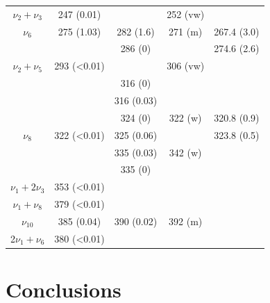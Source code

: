 \begin{table}[H]
\begin{center}
\begin{tabular}{c c c c c}
 		  $\nu_{2}+\nu_{3}$& 247 (0.01) &  & 252 (vw) & \\
 		  $\nu_{6}$ & 275 (1.03) & 282 (1.6) & 271 (m) & 267.4 (3.0)\\
 		  	&  & 286 (0) &  & 274.6 (2.6)\\
 		  	$\nu_{2}+ \nu_{5}$ & 293 (<0.01) &  & 306 (vw) & \\
 		  	& & 316 (0) & & \\
 		   & & 316 (0.03) & & \\
 		    &  & 324 (0) & 322 (w) & 320.8 (0.9)\\
 		    $\nu_{8}$& 322 (<0.01) & 325 (0.06) & & 323.8 (0.5)\\
 		    &  & 335 (0.03) & 342 (w) & \\
 		    & & 335 (0) & & \\
 		    $\nu_{1}+ 2\nu_{3}$ & 353 (<0.01) & &  & \\	
 		    $\nu_{1}+ \nu_{8}$ & 379 (<0.01) & & & \\
 		    $\nu_{10}$ & 385 (0.04) & 390 (0.02) &  392 (m) & \\
 		    2$\nu_{1}+ \nu_{6}$ & 380 (<0.01) &  & & \\
 		    \bottomrule	    
 		  \end{tabular}
 	\end{center}
 \end{table}
 
 \section*{Conclusions}
 
